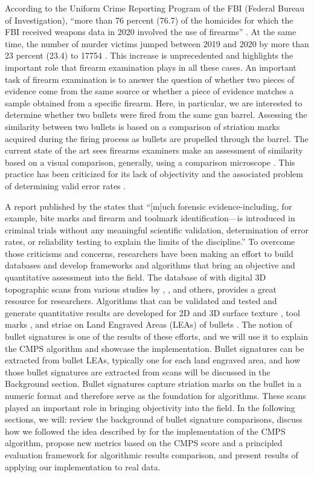 According to the Uniform Crime Reporting Program of the FBI (Federal
Bureau of Investigation), ``more than 76 percent (76.7) of the homicides
for which the FBI received weapons data in 2020 involved the use of
firearms'' \citep{fbiucr}. At the same time, the number of murder
victims jumped between 2019 and 2020 by more than 23 percent (23.4) to
17754 \citep{fbiucr20}. This increase is unprecedented and highlights
the important role that firearm examination plays in all these cases. An
important task of firearm examination is to answer the question of
whether two pieces of evidence come from the same source or whether a
piece of evidence matches a sample obtained from a specific firearm.
Here, in particular, we are interested to determine whether two bullets
were fired from the same gun barrel. Assessing the similarity between
two bullets is based on a comparison of striation marks acquired during
the firing process as bullets are propelled through the barrel. The
current state of the art sees firearms examiners make an assessment of
similarity based on a visual comparison, generally, using a comparison
microscope \citep{afte}. This practice has been criticized for its lack
of objectivity and the associated problem of determining valid error
rates \citep{pcast}.

A report published by the \citet{nrc} states that ``{[}m{]}uch forensic
evidence-including, for example, bite marks and firearm and toolmark
identification---is introduced in criminal trials without any meaningful
scientific validation, determination of error rates, or reliability
testing to explain the limits of the discipline.'' To overcome those
criticisms and concerns, researchers have been making an effort to build
databases and develop frameworks and algorithms that bring an objective
and quantitative assessment into the field. The database of
\citet{nistdb} with digital 3D topographic scans from various studies by
\citet{brundage}, \citet{hamby}, \citet{Hamby:2019} and others, provides
a great resource for researchers. Algorithms that can be validated and
tested and generate quantitative results are developed for 2D and 3D
surface texture \citep{song2005}, tool marks
\citep{ChumbleyL_Scott2010VoTM}, and striae on Land Engraved Areas
(LEAs) of bullets \citep[\citet{pmid30444940}, \citet{cmps}]{aoas}. The
notion of bullet signatures is one of the results of these efforts, and
we will use it to explain the CMPS algorithm and showcase the
 implementation. Bullet signatures can be extracted from
bullet LEAs, typically one for each land engraved area, and how those
bullet signatures are extracted from scans will be discussed in the
Background section. Bullet signatures capture striation marks on the
bullet in a numeric format and therefore serve as the foundation for
algorithms. These scans played an important role in bringing objectivity
into the field. In the following sections, we will: review the
background of bullet signature comparisons, discuss how we followed the
idea described by \citet{cmps} for the implementation of the CMPS
algorithm, propose new metrics based on the CMPS score and a principled
evaluation framework for algorithmic results comparison, and present
results of applying our implementation to real data.

